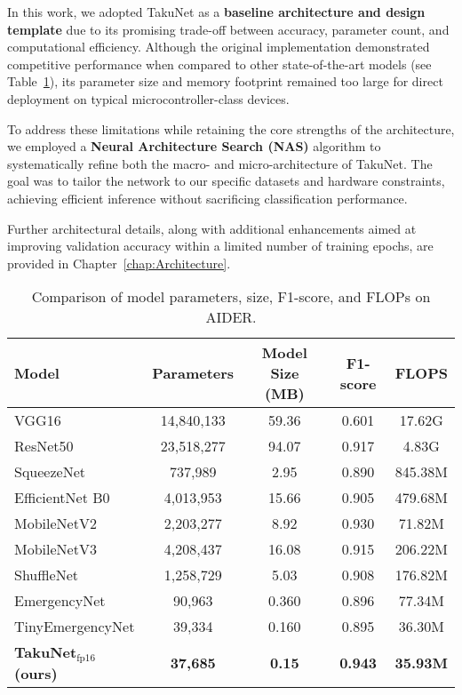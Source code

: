 In this work, we adopted TakuNet as a \textbf{baseline architecture and design template} due to its promising trade-off between accuracy, parameter count, and computational efficiency. Although the original implementation demonstrated competitive performance when compared to other state-of-the-art models (see Table~\ref{tab:model_comparison}), its parameter size and memory footprint remained too large for direct deployment on typical microcontroller-class devices. 

To address these limitations while retaining the core strengths of the architecture, we employed a \textbf{Neural Architecture Search (NAS)} algorithm to systematically refine both the macro- and micro-architecture of TakuNet. The goal was to tailor the network to our specific datasets and hardware constraints, achieving efficient inference without sacrificing classification performance.

Further architectural details, along with additional enhancements aimed at improving validation accuracy within a limited number of training epochs, are provided in Chapter~\ref{chap:Architecture}.


\begin{table}[h!]
\centering
\begin{tabular}{lcccc}
\hline
\textbf{Model} & \textbf{Parameters} & \textbf{Model Size (MB)} & \textbf{F1-score} & \textbf{FLOPS} \\
\hline
VGG16 \cite{simonyan2014very} & 14,840,133 & 59.36 & 0.601 & 17.62G \\
ResNet50 \cite{he2016deep} & 23,518,277 & 94.07 & 0.917 & 4.83G \\
SqueezeNet \cite{iandola2016squeezenet} & 737,989 & 2.95 & 0.890 & 845.38M \\
EfficientNet B0 \cite{tan2019efficientnet} & 4,013,953 & 15.66 & 0.905 & 479.68M \\
MobileNetV2 \cite{sandler2018mobilenetv2} & 2,203,277 & 8.92 & 0.930 & 71.82M \\
MobileNetV3 \cite{howard2019searching} & 4,208,437 & 16.08 & 0.915 & 206.22M \\
ShuffleNet \cite{zhang2018shufflenet} & 1,258,729 & 5.03 & 0.908 & 176.82M \\
EmergencyNet \cite{emergencynet} & 90,963 & 0.360 & 0.896 & 77.34M \\
TinyEmergencyNet \cite{tinyemergencynet} & 39,334 & 0.160 & 0.895 & 36.30M \\
\textbf{TakuNet$_\text{fp16}$ (ours)} & \textbf{37,685} & \textbf{0.15} & \textbf{0.943} & \textbf{35.93M} \\
\hline
\end{tabular}
\caption{Comparison of model parameters, size, F1-score, and FLOPs on AIDER.}
\label{tab:model_comparison}
\end{table}


